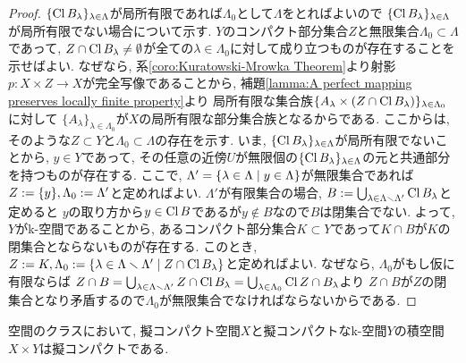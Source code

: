 \documentclass[uplatex, dvipdfmx, a4paper, 12pt, class=jsbook, crop=false]{standalone}
\begin{document}
\begin{proof}
	$ \{\mathop{\mathrm{Cl}}\nolimits B_\lambda\}_{\lambda \in \Lambda} $が局所有限であれば$ \Lambda_0 $として$ \Lambda $をとればよいので
	$ \{\mathop{\mathrm{Cl}}\nolimits B_\lambda\}_{\lambda \in \Lambda} $が局所有限でない場合について示す.
	$ Y $のコンパクト部分集合$ Z $と無限集合$ \Lambda_0 \subset \Lambda $であって,
	$ Z \cap \mathop{\mathrm{Cl}}\nolimits B_{\lambda} \neq \emptyset $が全ての$ \lambda \in \Lambda_0 $に対して成り立つものが存在することを示せばよい.
	なぜなら, 系\ref{coro:Kuratowski-Mrowka Theorem}より射影$ p \colon X \times Z \to X $が完全写像であることから,
	補題\ref{lamma:A perfect mapping preserves locally finite property}より
	局所有限な集合族$ \{A_\lambda \times (Z \cap \mathop{\mathrm{Cl}}\nolimits B_\lambda)\}_{\lambda \in \Lambda_0} $に対して
	$ \{A_\lambda\}_{\lambda \in \Lambda_0} $が$ X $の局所有限な部分集合族となるからである.
	ここからは, そのような$ Z \subset Y $と$ \Lambda_0 \subset \Lambda $の存在を示す.
	いま, $ \{\mathop{\mathrm{Cl}}\nolimits B_\lambda\}_{\lambda \in \Lambda} $が局所有限でないことから, $ y \in Y $であって,
	その任意の近傍$ U $が無限個の$ \{\mathop{\mathrm{Cl}}\nolimits B_\lambda\}_{\lambda \in \Lambda} $の元と共通部分を持つものが存在する.
	ここで, $ \Lambda' = \setcomp{\lambda \in \Lambda}{y \in \Lambda} $が無限集合であれば
	$ Z \mathrel{:=} \{y\}, \Lambda_0 \mathrel{:=} \Lambda' $と定めればよい.
	$ \Lambda' $が有限集合の場合, $ B \mathrel{:=} \bigcup_{\lambda \in \Lambda \smallsetminus \Lambda'} \mathop{\mathrm{Cl}}\nolimits B_\lambda $と定めると
	$ y $の取り方から$ y \in \mathop{\mathrm{Cl}}\nolimits B $であるが$ y \notin B $なので$ B $は閉集合でない.
	よって, $ Y $がk-空間であることから, あるコンパクト部分集合$ K \subset Y $であって$ K \cap B $が$ K $の閉集合とならないものが存在する.
	このとき, $ Z \defeq K, \Lambda_0 \defeq \setcomp{\lambda \in \Lambda \setminus \Lambda'}{Z \cap \topcl B_\lambda} $と定めればよい.
	なぜなら, $ \Lambda_0 $がもし仮に有限ならば
	$ Z \cap B = \bigcup_{\lambda \in \Lambda \smallsetminus \Lambda'} Z \cap \mathop{\mathrm{Cl}}\nolimits B_\lambda
	= \bigcup_{\lambda \in \Lambda_0} \mathop{\mathrm{Cl}}\nolimits Z \cap B_\lambda $より
	$ Z \cap B $が$ Z $の閉集合となり矛盾するので$ \Lambda_0 $が無限集合でなければならないからである.
\end{proof}

\begin{proposition}
	空間のクラスにおいて, 擬コンパクト空間$ X $と擬コンパクトなk-空間$ Y $の積空間$ X \times Y $は擬コンパクトである.
\end{proposition}
\end{document}
